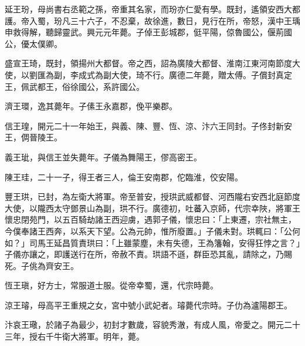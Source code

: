 \begin{pinyinscope}
 延王玢，母尚書右丞範之孫，帝重其名家，而玢亦仁愛有學。既封，遙領安西大都護。帝入蜀，玢凡三十六子，不忍棄，故徐進，數日，見行在所，帝怒，漢中王瑀申救得解，聽歸靈武。興元元年薨。子倬王彭城郡，侹平陽，倞魯國公，偃荊國公，優太僕卿。



 盛宣王琦，既封，領揚州大都督。帝之西，詔為廣陵大都督、淮南江東河南節度大使，以劉匯為副，李成式為副大使，琦不行。廣德二年薨，贈太傅。子償封真定王，佩武都王，俗徐國公，系許國公。



 濟王環，逸其薨年。子傃王永嘉郡，俛平樂郡。



 信王瑝，開元二十一年始王，與義、陳、豐、恆、涼、汴六王同封。子佟封新安王，倜晉陵王。



 義王玼，與信王並失薨年。子儀為舞陽王，僇高密王。



 陳王珪，二十一子，得王者三人，倫王安南郡，佗臨淮，佼安陽。



 豐王珙，已封，為左衛大將軍。帝至普安，授珙武威都督、河西隴右安西北庭節度大使，以隴西太守鄧景山為副，珙不行。廣德初，吐蕃入京師，代宗幸陜，將軍王懷忠閉苑門，以五百騎劫諸王西迎虜，遇郭子儀，懷忠曰：「上東遷，宗社無主，今僕奉諸王西奔，以系天下望。公為元帥，惟所廢置。」子儀未對。珙輒曰：「公何如？」司馬王延昌質責珙曰：「上雖蒙塵，未有失德，王為籓翰，安得狂悖之言？」子儀亦讓之，即護送行在所，帝赦不責。珙語不遜，群臣恐其亂，請除之，乃賜死。子佻為齊安王。



 恆王瑱，好方士，常服道士服。從帝幸蜀，還，代宗時薨。



 涼王璿，母高平王重規之女，宮中號小武妃者。璿薨代宗時。子仂為瀘陽郡王。



 汴哀王璥，於諸子為最少，初封才數歲，容貌秀澈，有成人風，帝愛之。開元二十三年，授右千牛衛大將軍。明年，薨。




\end{pinyinscope}
